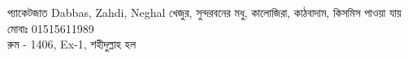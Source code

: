 \documentclass{article}
\begin{document}
\centering
{}
{{\fontsize{60}{72} \selectfont {}প্যাকেটজাত  Dabbas, Zahdi, Neghal  খেজুর, সুন্দরবনের মধু, কালোজিরা, কাঠবাদাম, কিসমিস পাওয়া যায়\\}{\fontsize{50}{60}\selectfont মোবাঃ 01515611989\\  রুম - 1406, Ex-1, শহীদুল্লাহ হল\\}\vspace{1.4cm}}
\end{document}
